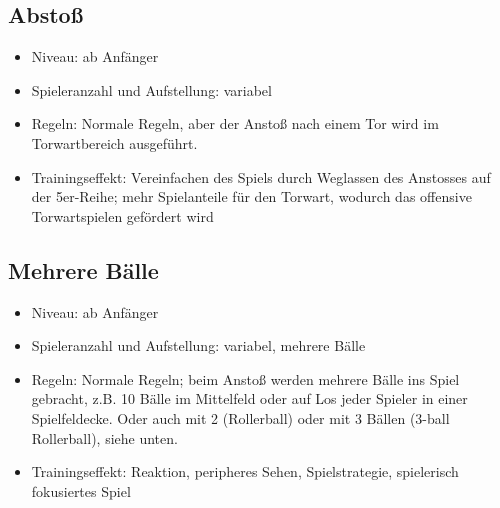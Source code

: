 \subsection{Abstoß}
\label{spielformen:sonderregeln:abstoss}

\begin{itemize}
\item Niveau: ab Anfänger
\item Spieleranzahl und Aufstellung: variabel 
\item Regeln: Normale Regeln, aber der Anstoß nach einem Tor wird im Torwartbereich ausgeführt. 
\item Trainingseffekt: Vereinfachen des Spiels durch Weglassen des Anstosses auf der 5er-Reihe; mehr Spielanteile für den Torwart, wodurch das offensive Torwartspielen  gefördert wird
\end{itemize}

\subsection{Mehrere Bälle}
\label{spielformen:sonderregeln:mehrerebaelle}

\begin{itemize}
\item Niveau: ab Anfänger
\item Spieleranzahl und Aufstellung: variabel, mehrere Bälle 
\item Regeln: Normale Regeln; beim Anstoß werden mehrere Bälle ins Spiel gebracht, z.B. 10 Bälle im Mittelfeld oder auf Los jeder Spieler in einer Spielfeldecke. Oder auch mit 2 (Rollerball) oder mit 3 Bällen (3-ball Rollerball), siehe unten. 
\item Trainingseffekt: Reaktion, peripheres Sehen, Spielstrategie, spielerisch fokusiertes Spiel 
\end{itemize}


